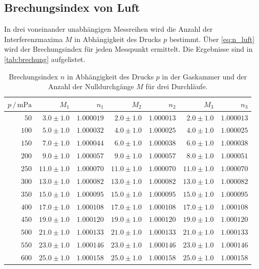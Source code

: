 \subsection{Brechungsindex von Luft}
In drei voneinander unabhängigen Messreihen wird die Anzahl der Interferenzmaxima $M$ in Abhängigkeit des Drucks $p$ bestimmt.
Über \autoref{eq:n_luft} wird der Brechungsindex für jeden Messpunkt ermittelt.
Die Ergebnisse sind in \autoref{tab:brechung} aufgelistet.
\begin{table}
    \centering
    \caption{Brechungsindex $n$ in Abhängigkeit des Drucks $p$ in der Gaskammer und der Anzahl der Nulldurchgänge $M$ für drei Durchläufe.}
    \label{tab:brechung}
    \begin{tabular}{r r r r r r r}
        \toprule
        $p \,/\, \unit{\milli\pascal}$ & $M_1$ & $n_1$ & $M_2$ & $n_2$ & $M_3$ & $n_3$ \\
        \midrule
        $50	    $ & $ 3.0\pm1.0	$ & $   1.000019$ & $ 	2.0\pm1.0 $ & $	1.000013$ & $	2.0\pm1.0	$ & $1.000013$ \\
    	$100	$ & $ 5.0\pm1.0	$ & $   1.000032$ & $ 	4.0\pm1.0 $ & $	1.000025$ & $	4.0\pm1.0	$ & $1.000025$ \\
    	$150	$ & $ 7.0\pm1.0	$ & $   1.000044$ & $ 	6.0\pm1.0 $ & $	1.000038$ & $	6.0\pm1.0	$ & $1.000038$ \\
    	$200	$ & $ 9.0\pm1.0	$ & $   1.000057$ & $ 	9.0\pm1.0 $ & $	1.000057$ & $	8.0\pm1.0	$ & $1.000051$ \\
    	$250	$ & $ 11.0\pm1.0$ & $	1.000070$ & $ 	11.0\pm1.0$ & $	1.000070$ & $	11.0\pm1.0	$ & $1.000070$ \\
    	$300	$ & $ 13.0\pm1.0$ & $	1.000082$ & $ 	13.0\pm1.0$ & $	1.000082$ & $	13.0\pm1.0	$ & $1.000082$ \\
    	$350	$ & $ 15.0\pm1.0$ & $	1.000095$ & $ 	15.0\pm1.0$ & $	1.000095$ & $	15.0\pm1.0	$ & $1.000095$ \\
    	$400	$ & $ 17.0\pm1.0$ & $	1.000108$ & $ 	17.0\pm1.0$ & $	1.000108$ & $	17.0\pm1.0	$ & $1.000108$ \\
    	$450	$ & $ 19.0\pm1.0$ & $	1.000120$ & $ 	19.0\pm1.0$ & $	1.000120$ & $	19.0\pm1.0	$ & $1.000120$ \\
    	$500	$ & $ 21.0\pm1.0$ & $	1.000133$ & $ 	21.0\pm1.0$ & $	1.000133$ & $	21.0\pm1.0	$ & $1.000133$ \\
    	$550	$ & $ 23.0\pm1.0$ & $	1.000146$ & $ 	23.0\pm1.0$ & $	1.000146$ & $	23.0\pm1.0	$ & $1.000146$ \\
    	$600	$ & $ 25.0\pm1.0$ & $	1.000158$ & $ 	25.0\pm1.0$ & $	1.000158$ & $	25.0\pm1.0	$ & $1.000158$ \\

\end{tabular}
\end{table}
